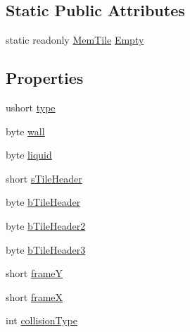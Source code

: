 \subsection*{Static Public Attributes}
\begin{DoxyCompactItemize}
\item 
static readonly \hyperlink{class_o_t_a_1_1_memory_1_1_mem_tile}{Mem\+Tile} \hyperlink{class_o_t_a_1_1_memory_1_1_mem_tile_a5a37cd0f6a4d5eecb9e285ea508473fb}{Empty}
\end{DoxyCompactItemize}
\subsection*{Properties}
\begin{DoxyCompactItemize}
\item 
ushort \hyperlink{class_o_t_a_1_1_memory_1_1_mem_tile_a1ba0b20369ea76b26ee3402c879e4809}{type}
\item 
byte \hyperlink{class_o_t_a_1_1_memory_1_1_mem_tile_a325c20962bd1199bd63cecd5c178fc40}{wall}
\item 
byte \hyperlink{class_o_t_a_1_1_memory_1_1_mem_tile_adc80d20c5e41ee772566d5ab550044a2}{liquid}
\item 
short \hyperlink{class_o_t_a_1_1_memory_1_1_mem_tile_adb45a14b2bfd64f87ff413f84219ef35}{s\+Tile\+Header}
\item 
byte \hyperlink{class_o_t_a_1_1_memory_1_1_mem_tile_aa9f3527a79d4abfc8d18dbbf5fa6940e}{b\+Tile\+Header}
\item 
byte \hyperlink{class_o_t_a_1_1_memory_1_1_mem_tile_aad8793e31ae4bf1278615a8e84a649f6}{b\+Tile\+Header2}
\item 
byte \hyperlink{class_o_t_a_1_1_memory_1_1_mem_tile_aa66a7546d0e20486f5402020298e2440}{b\+Tile\+Header3}
\item 
short \hyperlink{class_o_t_a_1_1_memory_1_1_mem_tile_a49a55987219b4292c8f68a8c6e9ce774}{frame\+Y}
\item 
short \hyperlink{class_o_t_a_1_1_memory_1_1_mem_tile_aee5c7b2e69c57a737bfbb5dc9550c8de}{frame\+X}
\item 
int \hyperlink{class_o_t_a_1_1_memory_1_1_mem_tile_ac24f3629173532a3f5007d54ddf5a3ad}{collision\+Type}
\end{DoxyCompactItemize}


